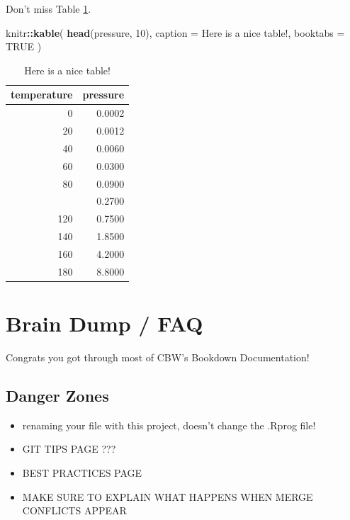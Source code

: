 \documentclass[
]{book}
\newenvironment{Shaded}{\begin{snugshade}}{\end{snugshade}}
\newcommand{\AttributeTok}[1]{\textcolor[rgb]{0.13,0.29,0.53}{#1}}
\newcommand{\ConstantTok}[1]{\textcolor[rgb]{0.56,0.35,0.01}{#1}}
\newcommand{\DecValTok}[1]{\textcolor[rgb]{0.00,0.00,0.81}{#1}}
\newcommand{\FunctionTok}[1]{\textcolor[rgb]{0.13,0.29,0.53}{\textbf{#1}}}
\newcommand{\NormalTok}[1]{#1}
\newcommand{\SpecialCharTok}[1]{\textcolor[rgb]{0.81,0.36,0.00}{\textbf{#1}}}
\newcommand{\StringTok}[1]{\textcolor[rgb]{0.31,0.60,0.02}{#1}}
\theoremstyle{definition}
\theoremstyle{definition}
\theoremstyle{definition}
\theoremstyle{definition}
\theoremstyle{remark}
\begin{document}
Don't miss Table \ref{tab:nice-tab}.

\begin{Shaded}
\begin{Highlighting}[]
\NormalTok{knitr}\SpecialCharTok{::}\FunctionTok{kable}\NormalTok{(}
  \FunctionTok{head}\NormalTok{(pressure, }\DecValTok{10}\NormalTok{), }\AttributeTok{caption =} \StringTok{\textquotesingle{}Here is a nice table!\textquotesingle{}}\NormalTok{,}
  \AttributeTok{booktabs =} \ConstantTok{TRUE}
\NormalTok{)}
\end{Highlighting}
\end{Shaded}

\begin{table}

\caption{\label{tab:nice-tab}Here is a nice table!}
\centering
\begin{tabular}[t]{rr}
\toprule
temperature & pressure\\
\midrule
0 & 0.0002\\
20 & 0.0012\\
40 & 0.0060\\
60 & 0.0300\\
80 & 0.0900\\
\addlinespace
100 & 0.2700\\
120 & 0.7500\\
140 & 1.8500\\
160 & 4.2000\\
180 & 8.8000\\
\bottomrule
\end{tabular}
\end{table}

\chapter{Brain Dump / FAQ}\label{help}

Congrats you got through most of CBW's Bookdown Documentation!

\section{Danger Zones}\label{danger-zones}

\begin{itemize}
\item
  renaming your file with this project, doesn't change the .Rprog file!
\item
  GIT TIPS PAGE ???
\item
  BEST PRACTICES PAGE
\item
  MAKE SURE TO EXPLAIN WHAT HAPPENS WHEN MERGE CONFLICTS APPEAR
\end{itemize}
\end{document}
